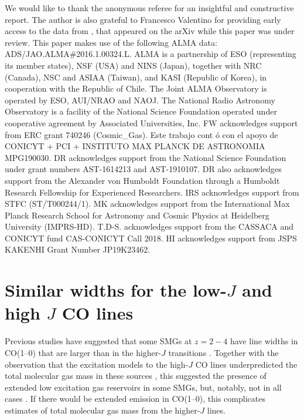 \documentclass[twocolumn]{aastex62}
\begin{document}
We would like to thank the anonymous referee for an insightful and constructive
report.  The author is also grateful to Francesco Valentino for providing early
access to the data from \cite{Valentino2020b}, that appeared on the arXiv while
this paper was under review.  This paper makes use of the following ALMA data:
ADS/JAO.ALMA\#2016.1.00324.L.  ALMA is a partnership of ESO (representing its
member states), NSF (USA) and NINS (Japan), together with NRC (Canada), NSC and
ASIAA (Taiwan), and KASI (Republic of Korea), in cooperation with the Republic
of Chile. The Joint ALMA Observatory is operated by ESO, AUI/NRAO and NAOJ.
The National Radio Astronomy Observatory is a facility of the National Science
Foundation operated under cooperative agreement by Associated Universities,
Inc.  FW acknowledges support from ERC grant 740246 (Cosmic\_Gas).  Este
trabajo cont \'o con el apoyo de CONICYT + PCI + INSTITUTO MAX PLANCK DE
ASTRONOMIA MPG190030.  DR acknowledges support from the National Science
Foundation under grant numbers AST-1614213 and AST-1910107.  DR also
acknowledges support from the Alexander von Humboldt Foundation through a
Humboldt Research Fellowship for Experienced Researchers.  IRS acknowledges
support from STFC (ST/T000244/1).  MK acknowledges support from the
International Max Planck Research School for Astronomy and Cosmic Physics at
Heidelberg University (IMPRS-HD).  T.D-S. acknowledges support from the CASSACA
and CONICYT fund CAS-CONICYT Call 2018.  HI acknowledges support from JSPS
KAKENHI Grant Number JP19K23462.



\appendix
\section{Similar widths for the low-$J$ and high $J$ CO lines}
\label{sec:similar-line-widths}
Previous studies have suggested that some SMGs at $z=2-4$ have line widths in
CO(1--0) that are larger than in the higher-$J$ transitions
\citep[e.g.,][although the difference is rather subtle, about $\sim 15$\%,
which is within the limits of our data]{Ivison2011}.  Together with the
observation that the excitation models to the high-$J$ CO lines underpredicted
the total molecular gas mass in these sources \citep[by a factor of
$\sim1.5 - 4.5$;][]{Riechers2011a}, this suggested the presence of extended low
excitation gas reservoirs in some SMGs, but, notably, not in all cases
\citep[e.g.,][]{Riechers2011b, Hodge2012}.  If there would be extended emission
in CO(1--0), this complicates estimates of total molecular gas mass from the
higher-$J$ lines.
\end{document}
